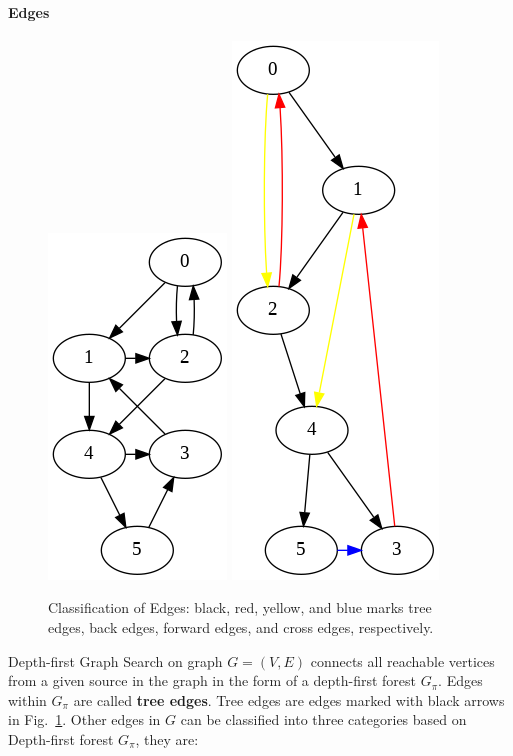 \documentclass[main.tex]{subfiles}
\begin{document}
\paragraph{Edges}
\begin{figure}[!ht]
    \centering
       \includegraphics[width=0.33\columnwidth]{fig/directed_cyclic_graph_2.png}
     \includegraphics[width=0.28\columnwidth]{fig/depth_first_graph_search_edges(1).png}
    \caption{Classification of Edges: black, red, yellow, and blue marks tree edges, back edges, forward edges, and cross edges, respectively.}
    \label{fig:depth_first_graph_search_edges}
\end{figure}
Depth-first Graph Search on graph $G=(V, E)$ connects all reachable vertices from a given source in the graph in the form of  a depth-first forest $G_\pi$. Edges within $G_\pi$ are called \textbf{tree edges}. Tree edges are edges marked with black arrows in Fig.~\ref{fig:depth_first_graph_search_edges}. Other edges in $G$ can be classified into three categories based on Depth-first forest $G_\pi$, they are:
\end{document}
